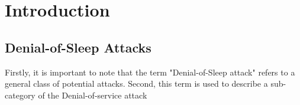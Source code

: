 \section{Introduction}

\subsection{Denial-of-Sleep Attacks}
 
Firstly, it is important to note that the term "Denial-of-Sleep attack" refers to a general class of potential attacks. Second, this term is used to describe a sub-category of the Denial-of-service attack
